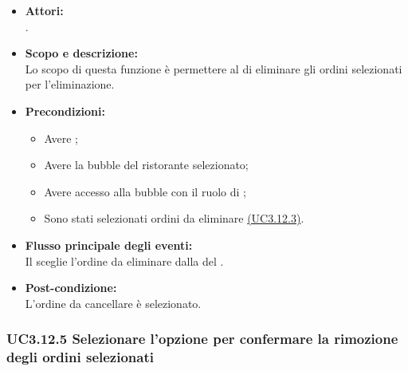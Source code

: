\begin{itemize}
	\item \textbf{Attori:}
	\\.
	\item \textbf{Scopo e descrizione:} 
	\\Lo scopo di questa funzione è permettere al  di eliminare gli ordini selezionati per l’eliminazione.
	\item \textbf{Precondizioni:}
	\begin{itemize}
		\item Avere ;
		\item Avere la bubble del ristorante selezionato;
		\item Avere accesso alla bubble con il ruolo di ;
		\item Sono stati selezionati ordini da eliminare \hyperref[UC3.12.3]{(UC3.12.3)}.
	\end{itemize}
	\item \textbf{Flusso principale degli eventi:}
	\\Il {} sceglie l’ordine da eliminare dalla  del .
	\item \textbf{Post-condizione:}
	\\L’ordine da cancellare è selezionato.
\end{itemize}

\subsubsection{UC3.12.5 Selezionare l’opzione per confermare la rimozione degli ordini selezionati} \label{UC3.12.5}

